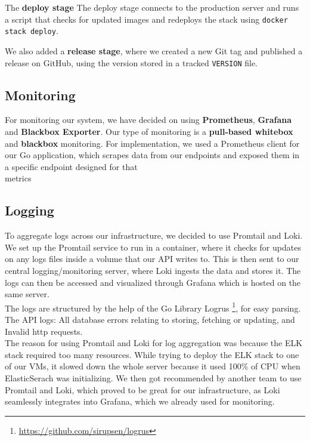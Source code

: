 The \textbf{deploy stage} The deploy stage connects to the production server and runs a script that checks for updated images and redeploys the stack using \texttt{docker stack deploy}.

We also added a \textbf{release stage}, where we created a new Git tag and published a release on GitHub, using the version stored in a tracked \texttt{VERSION} file.

\subsection{Monitoring} \label{sec:monitoring}

For monitoring our system, we have decided on using \textbf{Prometheus}, \textbf{Grafana} and \textbf{Blackbox Exporter}. Our type of monitoring is a \textbf{pull-based whitebox} and \textbf{blackbox} monitoring. For implementation, we used a Prometheus client for our Go application, which scrapes data from our endpoints and exposed them in a specific endpoint designed for that \\metrics


\subsection{Logging}
To aggregate logs across our infrastructure, we decided to use Promtail and Loki. We set up the Promtail service to run in a  container, where it checks for updates on any logs files inside a volume that our API writes to. This is then sent to our central logging/monitoring server, where Loki ingests the data and stores it. The logs can then be accessed and visualized through Grafana which is hosted on the same server.
\\

The logs are structured by the help of the Go Library Logrus \footnote{\url{https://github.com/sirupsen/logrus}}, for easy parsing. The API logs: All database errors relating to storing, fetching or updating, and Invalid http requests.
\\

The reason for using Promtail and Loki for log aggregation was because the ELK stack required too many resources. While trying to deploy the ELK stack to one of our VMs, it slowed down the whole server because it used 100\% of CPU when ElasticSerach was initializing. We then got recommended by another team to use Promtail and Loki, which proved to be great for our infrastructure, as Loki seamlessly integrates into Grafana, which we already used for monitoring.


